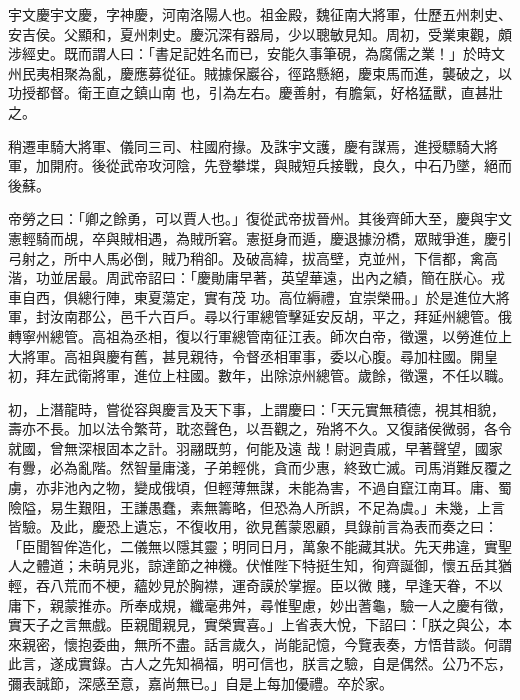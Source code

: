 
\begin{pinyinscope}

 宇文慶宇文慶，字神慶，河南洛陽人也。祖金殿，魏征南大將軍，仕歷五州刺史、安吉侯。父顯和，夏州刺史。慶沉深有器局，少以聰敏見知。周初，受業東觀，頗涉經史。既而謂人曰：「書足記姓名而已，安能久事筆硯，為腐儒之業！」於時文州民夷相聚為亂，慶應募從征。賊據保巖谷，徑路懸絕，慶束馬而進，襲破之，以功授都督。衛王直之鎮山南
 也，引為左右。慶善射，有膽氣，好格猛獸，直甚壯之。



 稍遷車騎大將軍、儀同三司、柱國府掾。及誅宇文護，慶有謀焉，進授驃騎大將軍，加開府。後從武帝攻河陰，先登攀堞，與賊短兵接戰，良久，中石乃墜，絕而後蘇。



 帝勞之曰：「卿之餘勇，可以賈人也。」復從武帝拔晉州。其後齊師大至，慶與宇文憲輕騎而覘，卒與賊相遇，為賊所窘。憲挺身而遁，慶退據汾橋，眾賊爭進，慶引弓射之，所中人馬必倒，賊乃稍卻。及破高緯，拔高壁，克並州，下信都，禽高湝，功並居最。周武帝詔曰：「慶勛庸早著，英望華遠，出內之績，簡在朕心。戎車自西，俱總行陣，東夏蕩定，實有茂
 功。高位縟禮，宜崇榮冊。」於是進位大將軍，封汝南郡公，邑千六百戶。尋以行軍總管擊延安反胡，平之，拜延州總管。俄轉寧州總管。高祖為丞相，復以行軍總管南征江表。師次白帝，徵還，以勞進位上大將軍。高祖與慶有舊，甚見親待，令督丞相軍事，委以心腹。尋加柱國。開皇初，拜左武衛將軍，進位上柱國。數年，出除涼州總管。歲餘，徵還，不任以職。



 初，上潛龍時，嘗從容與慶言及天下事，上謂慶曰：「天元實無積德，視其相貌，壽亦不長。加以法令繁苛，耽恣聲色，以吾觀之，殆將不久。又復諸侯微弱，各令就國，曾無深根固本之計。羽翮既剪，何能及遠
 哉！尉迥貴戚，早著聲望，國家有釁，必為亂階。然智量庸淺，子弟輕佻，貪而少惠，終致亡滅。司馬消難反覆之虜，亦非池內之物，變成俄頃，但輕薄無謀，未能為害，不過自竄江南耳。庸、蜀險隘，易生艱阻，王謙愚蠢，素無籌略，但恐為人所誤，不足為虞。」未幾，上言皆驗。及此，慶恐上遺忘，不復收用，欲見舊蒙恩顧，具錄前言為表而奏之曰：「臣聞智侔造化，二儀無以隱其靈；明同日月，萬象不能藏其狀。先天弗違，實聖人之體道；未萌見兆，諒達節之神機。伏惟陛下特挺生知，徇齊誕御，懷五岳其猶輕，吞八荒而不梗，蘊妙見於胸襟，運奇謨於掌握。臣以微
 賤，早逢天眷，不以庸下，親蒙推赤。所奉成規，纖毫弗舛，尋惟聖慮，妙出蓍龜，驗一人之慶有徵，實天子之言無戲。臣親聞親見，實榮實喜。」上省表大悅，下詔曰：「朕之與公，本來親密，懷抱委曲，無所不盡。話言歲久，尚能記憶，今覽表奏，方悟昔談。何謂此言，遂成實錄。古人之先知禍福，明可信也，朕言之驗，自是偶然。公乃不忘，彌表誠節，深感至意，嘉尚無已。」自是上每加優禮。卒於家。




\end{pinyinscope}
